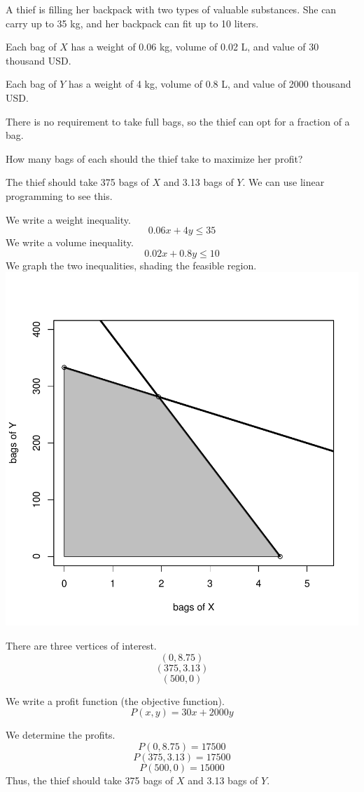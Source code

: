 
\begin{question}
A thief is filling her backpack with two types of valuable substances.
She can carry up to 35 kg, and her backpack can fit up to 10 liters.

Each bag of \(X\) has a weight of 0.06 kg, volume of 0.02 L, and value
of 30 thousand USD.

Each bag of \(Y\) has a weight of 4 kg, volume of 0.8 L, and value of
2000 thousand USD.

There is no requirement to take full bags, so the thief can opt for a
fraction of a bag.

How many bags of each should the thief take to maximize her profit?
\end{question}

\begin{solution}
The thief should take 375 bags of \(X\) and 3.13 bags of \(Y\). We can
use linear programming to see this.

We write a weight inequality. \[0.06x+4y \le 35\] We write a volume
inequality. \[0.02x+0.8y \le 10\] We graph the two inequalities, shading
the feasible region. \includegraphics{unnamed-chunk-1-1.pdf}

There are three vertices of interest. \[(0,8.75) \] \[(375,3.13) \]
\[(500,0)\]

We write a profit function (the objective function).
\[P(x,y) = 30x+2000y \]

We determine the profits. \[P(0,8.75)=17500 \] \[P(375,3.13)=17500 \]
\[P(500,0)=15000 \] Thus, the thief should take 375 bags of \(X\) and
3.13 bags of \(Y\).
\end{solution}


